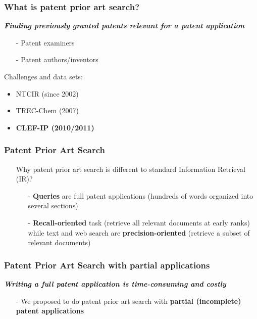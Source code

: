 \documentclass[xcolor=x11names,compress]{beamer}
\renewcommand{\(}{\begin{columns}}
\renewcommand{\)}{\end{columns}}
\newcommand{\<}[1]{\begin{column}{#1}}
\renewcommand{\>}{\end{column}}
\begin{document}
\begin{frame}
\frametitle{What is patent prior art search?}
{\color{DeepSkyBlue4}\textit{\textbf{Finding previously granted patents relevant for a patent application}}}

\begin{itemize}
\item[-] Patent examiners
\item[-] Patent authors/inventors
\item[]
\end{itemize}


Challenges and data sets:
\begin{itemize}
\item NTCIR (since 2002)
\item TREC-Chem (2007)
\item \textbf{CLEF-IP (2010/2011)}
\end{itemize}
\end{frame}



\begin{frame}
\frametitle{Patent Prior Art Search}
\begin{itemize}
\item[] Why patent prior art search is different to standard Information Retrieval (IR)?
  \begin{itemize}
  \item[]
  \item[-] \textbf{Queries} are full patent applications (hundreds of words organized into several sections)  	
   \item[]
  \item[-] \textbf{Recall-oriented} task (retrieve all relevant documents at early ranks)
  	while text and web search are \textbf{precision-oriented} (retrieve a subset of relevant documents)
  \end{itemize}
\end{itemize}
\end{frame}



\begin{frame}
\frametitle{Patent Prior Art Search with partial applications}

{\color{DeepSkyBlue4}\textit{\textbf{Writing a full patent application is time-consuming and costly}}}

\begin{itemize}
\item[-] We proposed to do patent prior art search with \textbf{partial (incomplete) patent applications}
\end{itemize}
\end{frame}
\end{document}
